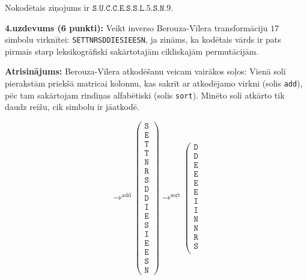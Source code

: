 \documentclass[11pt]{article}
\begin{document}
Nokodētais ziņojums ir $\mathtt{S.U.C.C.E.S.S.L.5.S.N.9}$.


{\footnotesize
\vspace{6pt}
{\bf 4.uzdevums (6 punkti):}
Veikt inverso Berouza-Vīlera transformāciju $17$ simbolu virknītei: {\tt SETTNRSDDIESIEESN},
ja zināms, ka kodētais vārds ir pats pirmais starp leksikogrāfiski sakārtotajām cikliskajām permutācijām.
}

\vspace{6pt}
{\bf Atrisinājums:}
Berouza-Vīlera atkodēšanu veicam vairākos soļos: Vienā solī pierakstām priekšā matricai kolonnu, kas
sakrīt ar atkodējamo virkni (solis {\tt add}), pēc tam
sakārtojam rindiņas alfabētiski (solis {\tt sort}). Minēto soli atkārto tik daudz reižu, cik
simbolu ir jāatkodē.

{\footnotesize
\[
\mathop{\longrightarrow}^{\text{add}}
\left(
\begin{array}{c}
\mathtt{S} \\
\mathtt{E} \\
\mathtt{T} \\
\mathtt{T} \\
\mathtt{N} \\
\mathtt{R} \\
\mathtt{S} \\
\mathtt{D} \\
\mathtt{D} \\
\mathtt{I} \\
\mathtt{E} \\
\mathtt{S} \\
\mathtt{I} \\
\mathtt{E} \\
\mathtt{E} \\
\mathtt{S} \\
\mathtt{N}
\end{array} \right)
\mathop{\longrightarrow}^{\text{sort}}
\left(
\begin{array}{c}
\mathtt{D} \\
\mathtt{D} \\
\mathtt{E} \\
\mathtt{E} \\
\mathtt{E} \\
\mathtt{E} \\
\mathtt{I} \\
\mathtt{I} \\
\mathtt{N} \\
\mathtt{N} \\
\mathtt{R} \\
\mathtt{S} \\

\end{array}\]}
\end{document}
